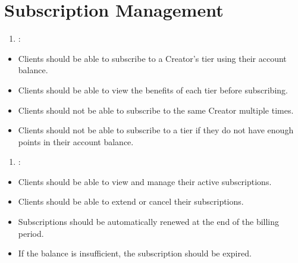 \documentclass[letterpaper,10pt,english]{sphinxmanual}
\begin{document}
\section{Subscription Management}
\label{\detokenize{modules/requirements:subscription-management}}\begin{enumerate}
%
\setcounter{enumi}{9}
\item {} 
\sphinxAtStartPar
{}:

\end{enumerate}
\begin{itemize}
\item {} 
\sphinxAtStartPar
Clients should be able to subscribe to a Creator’s tier using their account balance.

\item {} 
\sphinxAtStartPar
Clients should be able to view the benefits of each tier before subscribing.

\item {} 
\sphinxAtStartPar
Clients should not be able to subscribe to the same Creator multiple times.

\item {} 
\sphinxAtStartPar
Clients should not be able to subscribe to a tier if they do not have enough points in their account balance.

\end{itemize}
\begin{enumerate}
%
\setcounter{enumi}{10}
\item {} 
\sphinxAtStartPar
{}:

\end{enumerate}
\begin{itemize}
\item {} 
\sphinxAtStartPar
Clients should be able to view and manage their active subscriptions.

\item {} 
\sphinxAtStartPar
Clients should be able to extend or cancel their subscriptions.

\item {} 
\sphinxAtStartPar
Subscriptions should be automatically renewed at the end of the billing period.

\item {} 
\sphinxAtStartPar
If the balance is insufficient, the subscription should be expired.

\end{itemize}
\end{document}
